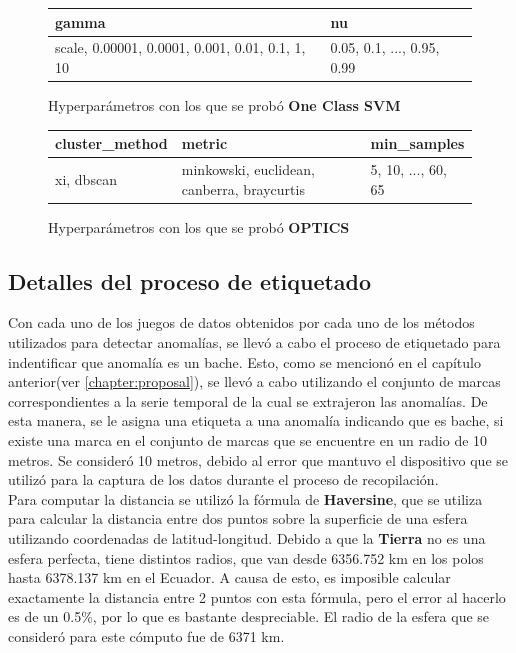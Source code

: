 		\begin{figure}[htb]
			\centering
			\begin{tabular}{ll}
				\toprule
				                                            gamma &                                                 nu \\
				\midrule
				  scale, 0.00001, 0.0001, 0.001, 0.01, 0.1, 1, 10 &  0.05, 0.1, ..., 0.95, 0.99 \\
				\bottomrule
			\end{tabular}
			\caption{Hyperparámetros con los que se probó \textbf{One Class SVM}}
			\label{table:5}
		\end{figure}
		
		\begin{figure}[htb]
			\centering
			\begin{tabular}{lll}
				\toprule
				 cluster\_method &                                      metric &                                        min\_samples \\
				\midrule
				     xi, dbscan &  minkowski, euclidean, canberra, braycurtis &  5, 10, ..., 60, 65 \\
				\bottomrule
			\end{tabular}
			\caption{Hyperparámetros con los que se probó \textbf{OPTICS}}
			\label{table:6}
		\end{figure}

	\subsection{Detalles del proceso de etiquetado}
		Con cada uno de los juegos de datos obtenidos por cada uno de los métodos utilizados para detectar anomalías, se llevó a cabo
		el proceso de etiquetado para indentificar que anomalía es un bache. Esto, como se mencionó en el capítulo anterior(ver \ref{chapter:proposal}),
		se llevó a cabo utilizando el conjunto de marcas correspondientes a la serie temporal de la cual se extrajeron las anomalías. De esta manera, se
		le asigna una etiqueta a una anomalía indicando que es bache, si existe una marca en el conjunto de marcas que se encuentre en un radio de 10
		metros. Se consideró 10 metros, debido al error que mantuvo el dispositivo que se utilizó para la captura de los datos durante el proceso de
		recopilación.\\
		\indent Para computar la distancia se utilizó la fórmula de \textbf{Haversine}, que se utiliza para calcular la distancia entre dos puntos sobre la
		superficie de una esfera utilizando coordenadas de latitud-longitud. Debido a que la \textbf{Tierra} no es una esfera perfecta, tiene distintos radios, que
		van desde 6356.752 km en los polos hasta 6378.137 km en el Ecuador. A causa de esto, es imposible calcular exactamente la distancia entre 2 puntos
		con esta fórmula, pero el error al hacerlo es de un 0.5\%, por lo que es bastante despreciable. El radio de la esfera que se consideró para este
		cómputo fue de 6371 km.\\

